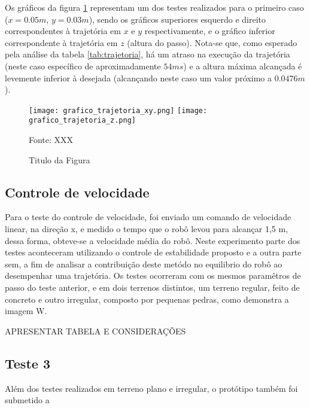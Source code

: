 \documentclass[../main.tex]{subfiles}
\begin{document}
  Os gráficos da figura \ref{fig:grafico_trajetoria_xyz} representam um dos testes realizados para o primeiro caso ($x=0.05m$, $y=0.03m$), sendo os gráficos superiores esquerdo e direito correspondentes à trajetória em $x$ e $y$ respectivamente, e o gráfico inferior correspondente à trajetória em $z$ (altura do passo). Nota-se que, como esperado pela análise da tabela \ref{tab:trajetoria}, há um atraso na execução da trajetória (neste caso específico de aproximadamente $54ms$) e a altura máxima alcançada é levemente inferior à desejada (alcançando neste caso um valor próximo a $0.0476m$).

  \begin{figure}[h]
    \centering
    \caption{Titulo da Figura}
    \texttt{[image: grafico\_trajetoria\_xy.png]}
    \texttt{[image: grafico\_trajetoria\_z.png]}
    
    Fonte: XXX
    \label{fig:grafico_trajetoria_xyz}
  \end{figure}

  \subsection{Controle de velocidade}

  Para o teste do controle de velocidade, foi enviado um comando de velocidade linear, na direção x, e medido o tempo que o robô levou para alcançar 1,5 m, dessa forma, obteve-se a velocidade média do robô. Neste experimento parte dos testes aconteceram utilizando o controle de estabilidade proposto e a outra parte sem, a fim de analisar a contribuição deste metódo no equilibrio do robô ao desempenhar uma trajetória. Os testes ocorreram com os mesmos paramêtros de passo do teste anterior, e em dois terrenos distintos, um terreno regular, feito de concreto e outro irregular, composto por pequenas pedras, como demonstra a imagem W.

  APRESENTAR TABELA E CONSIDERAÇÕES
  
  \subsection{Teste 3}
  Além dos testes realizados em terreno plano e irregular, o protótipo também foi submetido a 
\end{document}
